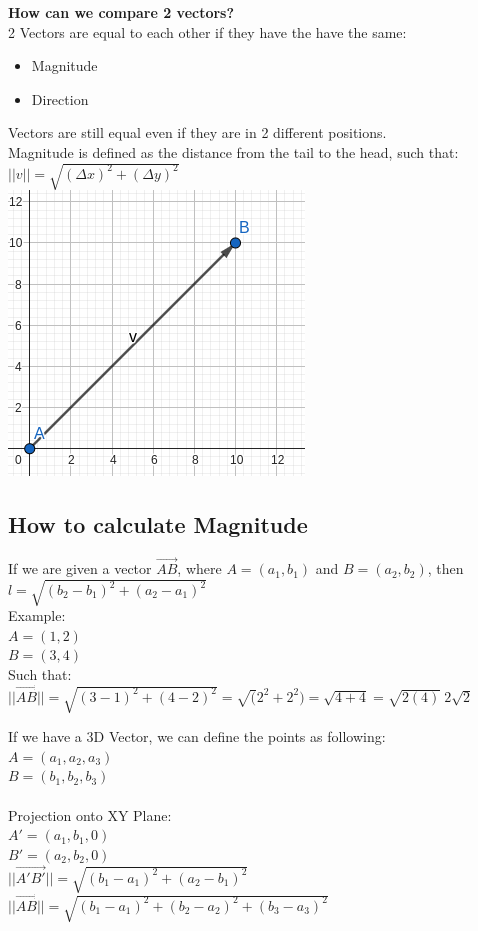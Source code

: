 \documentclass[]{article}
\begin{document}
    \textbf{How can we compare 2 vectors?}\\
    2 Vectors are equal to each other if they have the have the same:
    \begin{itemize}
        \item Magnitude
        \item Direction
    \end{itemize}
     Vectors are still equal even if they are in 2 different positions.\\
    \hspace*{.2in}Magnitude is defined as the distance from the tail to the head, such that:\\
    $||v|| = \sqrt{(\Delta x)^2+(\Delta y)^2}$\\
    \includegraphics{Picture2.png}
    \subsection*{How to calculate Magnitude}
    If we are given a vector $\overrightarrow{AB}$, where $A=(a_1, b_1)$ and $B=(a_2, b_2)$, then $l = \sqrt{(b_2-b_1)^2+(a_2-a_1)^2}$\\
    Example:\\
        $A = (1, 2)$\\
        $B = (3, 4)$\\
        Such that:\\
        $||\overrightarrow{AB}|| = \sqrt{(3-1)^2+(4-2)^2} = \sqrt(2^2+2^2) = \sqrt{4+4} = \sqrt{2(4)} \ 2\sqrt{2}$

    If we have a 3D Vector, we can define the points as following:\\
    $A = (a_1, a_2, a_3)$\\
    $B = (b_1, b_2, b_3)$\\
    \\
    Projection onto XY Plane:\\
    $A' = (a_1, b_1, 0)$\\
    $B' = (a_2, b_2, 0)$\\
    $||\overrightarrow{A'B'}|| = \sqrt{(b_1-a_1)^2+(a_2-b_1)^2}$
    $||\overrightarrow{AB}|| = \sqrt{(b_1-a_1)^2+(b_2-a_2)^2+(b_3-a_3)^2}$
\end{document}
